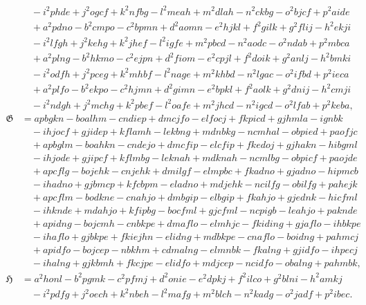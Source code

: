\documentclass[11pt,a4paper]{book}
\begin{document}
\begin{align*}
&\quad -i^2phde + j^2ogcf + k^2nfbg - l^2meah + m^2dlah - n^2ckbg - o^2bjcf + p^2aide \\
&\quad +a^2pdno - b^2cmpo - c^2bpmn + d^2aomn - e^2hjkl + f^2gilk + g^2flij - h^2ekji \\
&\quad -i^2lfgh + j^2kehg + k^2jhef - l^2igfe + m^2pbcd - n^2aodc - o^2ndab + p^2mbca \\
&\quad +a^2plng - b^2hkmo - c^2ejpn + d^2fiom - e^2cpjl + f^2doik + g^2anlj - h^2bmki \\
&\quad -i^2odfh + j^2pceg + k^2mhbf - l^2nage + m^2khbd - n^2lgac - o^2ifbd + p^2ieca \\
&\quad +a^2plfo - b^2ekpo - c^2hjmn + d^2gimn - e^2bpkl + f^2aolk + g^2dnij - h^2cmji \\
&\quad -i^2ndgh + j^2mchg + k^2pbef - l^2oafe + m^2jhcd - n^2igcd - o^2lfab + p^2keba, \\
\mathfrak{G} &= apbgkn - boalhm - cndiep + dmcjfo - elfocj + fkpicd + gjhmla - ignbk \\
&\quad -ihjocf + gjidep + kflamh - lekbng + mdnbkg - ncmhal - obpied + paofjc \\
&\quad +apbglm - boahkn - cndejo + dmcfip - elcfip + fkedoj + gjhakn - hibgml \\
&\quad -ihjode + gjipcf + kflmbg - leknah + mdknah - ncmlbg - obpicf + paojde \\
&\quad +apcflg - bojehk - cnjehk + dmilgf - elmpbc + fkadno + gjadno - hipmcb \\
&\quad -ihadno + gjbmcp + kfcbpm - eladno + mdjehk - ncilfg - obilfg + pahejk \\
&\quad +apcflm - bodkne - cnahjo + dmbgip - elbgip + fkahjo + gjednk - hicfml \\
&\quad -ihknde + mdahjo + kfipbg - bocfml + gjcfml - ncpigb - leahjo + paknde \\
&\quad +apidng - bojcmh - cnbkpe + dmaflo - elmhjc - fkiding + gjaflo - ihbkpe \\
&\quad -ihaflo + gjbkpe + fkiejhn - elidng + mdbkpe - cnaflo - boidng + pahmcj \\
&\quad +apidfo - bojcep - nbkhm + cdmalng - elmnbk - fkalng + gjidfo - ihpecj \\
&\quad -ihalng + gjkbmh + fkcjpe - elidfo + mdjcep - ncidfo - obalng + pahmbk, \\
\mathfrak{H} &= a^2honl - b^2pgmk - c^2pfmj + d^2onie - e^2dpkj + f^2ilco + g^2blni - h^2amkj \\
&\quad -i^2pdfg + j^2oech + k^2nbeh - l^2mafg + m^2blch - n^2kadg - o^2jadf + p^2ibec.
\end{align*}
\end{document}
